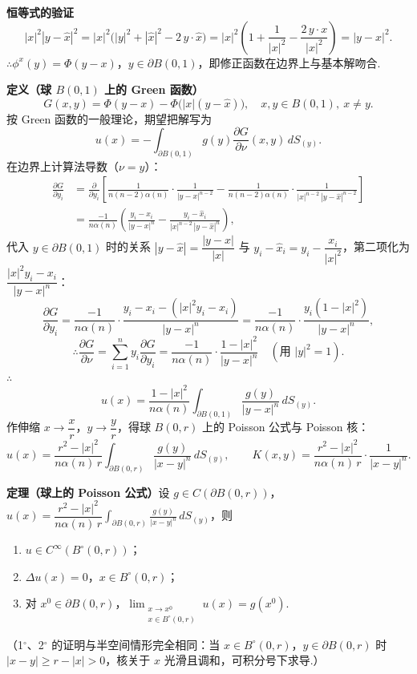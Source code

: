 \documentclass{article}
\begin{document}
\noindent\textbf{恒等式的验证}\quad
\[
|x|^2 |y-\hat{x}|^2 = |x|^2 \big( |y|^2 + |\hat{x}|^2 - 2\, y \cdot \hat{x} \big) = |x|^2 \left( 1 + \frac{1}{|x|^2} - \frac{2\, y \cdot x}{|x|^2} \right) = |y - x|^2.
\]
$\therefore \phi^x(y) = \Phi(y-x)$，$y \in \partial B(0,1)$，即修正函数在边界上与基本解吻合.

\noindent\textbf{定义（球 $B(0,1)$ 上的 Green 函数）}\quad
\[
G(x,y) = \Phi(y-x) - \Phi\big( |x| (y - \hat{x}) \big), \quad x,y \in B(0,1),\ x \neq y.
\]
按 Green 函数的一般理论，期望把解写为
\[
u(x) = -\int_{\partial B(0,1)} g(y) \frac{\partial G}{\partial \nu}(x,y)\, dS_{(y)}.
\]
在边界上计算法导数（$\nu = y$）：
\[
\begin{aligned}
	\frac{\partial G}{\partial y_i} &= \frac{\partial}{\partial y_i} \left[ \frac{1}{n(n-2)\alpha(n)} \cdot \frac{1}{|y-x|^{n-2}} - \frac{1}{n(n-2)\alpha(n)} \cdot \frac{1}{|x|^{n-2}\, |y-\hat{x}|^{n-2}} \right] \\
	&= \frac{-1}{n\alpha(n)} \left( \frac{y_i - x_i}{|y-x|^n} - \frac{y_i - \hat{x}_i}{|x|^{n-2}\, |y-\hat{x}|^n} \right),
\end{aligned}
\]
代入 $y \in \partial B(0,1)$ 时的关系 $|y-\hat{x}| = \dfrac{|y-x|}{|x|}$ 与 $y_i - \hat{x}_i = y_i - \dfrac{x_i}{|x|^2}$，第二项化为 $\dfrac{|x|^2 y_i - x_i}{|y-x|^n}$：
\[
\frac{\partial G}{\partial y_i} = \frac{-1}{n\alpha(n)} \cdot \frac{y_i - x_i - (|x|^2 y_i - x_i)}{|y-x|^n} = \frac{-1}{n\alpha(n)} \cdot \frac{y_i (1-|x|^2)}{|y-x|^n},
\]
\[
\therefore \frac{\partial G}{\partial \nu} = \sum_{i=1}^n y_i \frac{\partial G}{\partial y_i} = \frac{-1}{n\alpha(n)} \cdot \frac{1-|x|^2}{|y-x|^n} \quad (\text{用 } |y|^2 = 1).
\]
$\therefore$
\[
u(x) = \frac{1-|x|^2}{n\alpha(n)} \int_{\partial B(0,1)} \frac{g(y)}{|y-x|^n}\, dS_{(y)}.
\]
作伸缩 $x \to \dfrac{x}{r}$，$y \to \dfrac{y}{r}$，得球 $B(0,r)$ 上的 Poisson 公式与 Poisson 核：
\[
u(x) = \frac{r^2-|x|^2}{n\alpha(n)\, r} \int_{\partial B(0,r)} \frac{g(y)}{|x-y|^n}\, dS_{(y)}, \qquad K(x,y) = \frac{r^2-|x|^2}{n\alpha(n)\, r} \cdot \frac{1}{|x-y|^n}.
\]

\noindent\textbf{定理（球上的 Poisson 公式）}\quad 设 $g \in C(\partial B(0,r))$，$u(x) = \dfrac{r^2-|x|^2}{n\alpha(n)\, r} \displaystyle \int_{\partial B(0,r)} \frac{g(y)}{|x-y|^n}\, dS_{(y)}$，则
\begin{enumerate}[label=\arabic*$^\circ$, left=0pt]
	
	\item $u \in C^\infty(B^\circ(0,r))$；
	\item $\Delta u(x) = 0$，$x \in B^\circ(0,r)$；
	\item 对 $x^0 \in \partial B(0,r)$，$\displaystyle \lim_{\substack{x \to x^0 \\ x \in B^\circ(0,r)}} u(x) = g(x^0)$.
\end{enumerate}
（1$^\circ$、2$^\circ$ 的证明与半空间情形完全相同：当 $x \in B^\circ(0,r)$，$y \in \partial B(0,r)$ 时 $|x-y| \geq r - |x| > 0$，核关于 $x$ 光滑且调和，可积分号下求导.）
\end{document}
